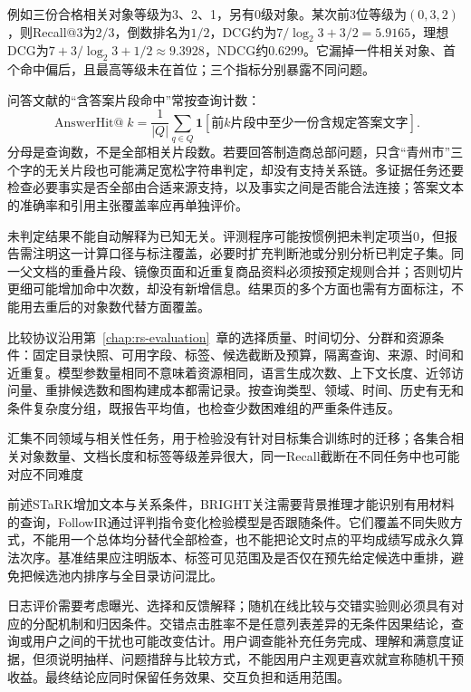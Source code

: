 例如三份合格相关对象等级为3、2、1，另有0级对象。某次前3位等级为$(0,3,2)$，则Recall@3为$2/3$，倒数排名为$1/2$，DCG约为$7/\log_2 3+3/2=5.9165$，理想DCG为$7+3/\log_2 3+1/2\approx9.3928$，NDCG约0.6299。它漏掉一件相关对象、首个命中偏后，且最高等级未在首位；三个指标分别暴露不同问题。

问答文献的“含答案片段命中”常按查询计数：
\begin{equation}
 \operatorname{AnswerHit@}k=
 \frac1{|Q|}\sum_{q\in Q}
 \mathbf1[\text{前}k\text{片段中至少一份含规定答案文字}].
 \label{eq:rs-search-answer-hit}
\end{equation}
分母是查询数，不是全部相关片段数。若要回答制造商总部问题，只含“青州市”三个字的无关片段也可能满足宽松字符串判定，却没有支持关系链。多证据任务还要检查必要事实是否全部由合适来源支持，以及事实之间是否能合法连接；答案文本的准确率和引用主张覆盖率应再单独评价。

未判定结果不能自动解释为已知无关。评测程序可能按惯例把未判定项当0，但报告需注明这一计算口径与标注覆盖，必要时扩充判断池或分别分析已判定子集。同一父文档的重叠片段、镜像页面和近重复商品资料必须按预定规则合并；否则切片更细可能增加命中次数，却没有新增信息。结果页的多个方面也需有方面标注，不能用去重后的对象数代替方面覆盖。

比较协议沿用第~\ref{chap:rs-evaluation}~章的选择质量、时间切分、分群和资源条件：固定目录快照、可用字段、标签、候选截断及预算，隔离查询、来源、时间和近重复。模型参数量相同不意味着资源相同，语言生成次数、上下文长度、近邻访问量、重排候选数和图构建成本都需记录。按查询类型、领域、时间、历史有无和条件复杂度分组，既报告平均值，也检查少数困难组的严重条件违反。

\Needspace{80mm}
汇集不同领域与相关性任务，用于检验没有针对目标集合训练时的迁移；各集合相关对象数量、文档长度和标签等级差异很大，同一Recall截断在不同任务中也可能对应不同难度

前述STaRK增加文本与关系条件，BRIGHT关注需要背景推理才能识别有用材料的查询，FollowIR通过评判指令变化检验模型是否跟随条件。它们覆盖不同失败方式，不能用一个总体均分替代全部检查，也不能把论文时点的平均成绩写成永久算法次序。基准结果应注明版本、标签可见范围及是否仅在预先给定候选中重排，避免把候选池内排序与全目录访问混比。

日志评价需要考虑曝光、选择和反馈解释；随机在线比较与交错实验则必须具有对应的分配机制和归因条件。交错点击胜率不是任意列表差异的无条件因果结论，查询或用户之间的干扰也可能改变估计。用户调查能补充任务完成、理解和满意度证据，但须说明抽样、问题措辞与比较方式，不能因用户主观更喜欢就宣称随机干预收益。最终结论应同时保留任务效果、交互负担和适用范围。

